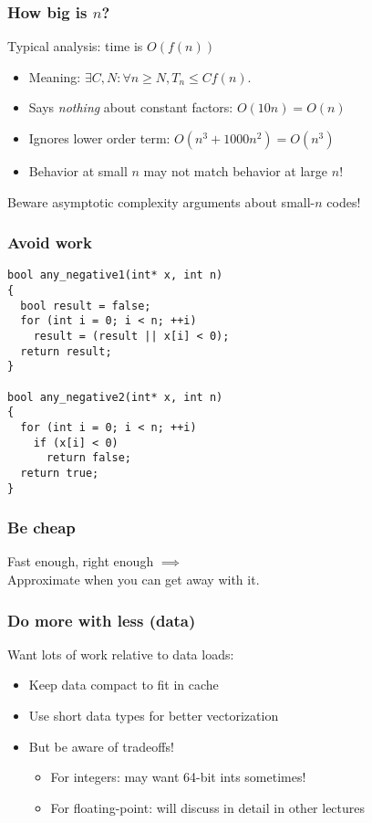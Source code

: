 \documentclass{beamer}
\begin{document}
\begin{frame}
  \frametitle{How big is $n$?}

  Typical analysis: time is $O(f(n))$
  \begin{itemize}
  \item Meaning: $\exists C, N : \forall n \geq N, T_n \leq C f(n)$.
  \item Says {\em nothing} about constant factors: $O(10 n) = O(n)$
  \item Ignores lower order term: $O(n^3 + 1000 n^2) = O(n^3)$
  \item Behavior at small $n$ may not match behavior at large $n$!
  \end{itemize}
  Beware asymptotic complexity arguments about small-$n$ codes!
  
\end{frame}


\begin{frame}[fragile]
  \frametitle{Avoid work}

\begin{lstlisting}
bool any_negative1(int* x, int n)
{
  bool result = false;
  for (int i = 0; i < n; ++i)
    result = (result || x[i] < 0);
  return result;
}

bool any_negative2(int* x, int n)
{
  for (int i = 0; i < n; ++i)
    if (x[i] < 0)
      return false;
  return true;
}
\end{lstlisting}
\end{frame}


\begin{frame}
  \frametitle{Be cheap}

  Fast enough, right enough $\implies$ \\
  \hfill Approximate when you can get away with it.
\end{frame}


\begin{frame}
  \frametitle{Do more with less (data)}

  Want lots of work relative to data loads:
  \begin{itemize}
  \item Keep data compact to fit in cache
  \item Use short data types for better vectorization
  \item But be aware of tradeoffs!
    \begin{itemize}
    \item For integers: may want 64-bit ints sometimes!
    \item For floating-point: will discuss in detail in other lectures
    \end{itemize}
  \end{itemize}
\end{frame}
\end{document}
